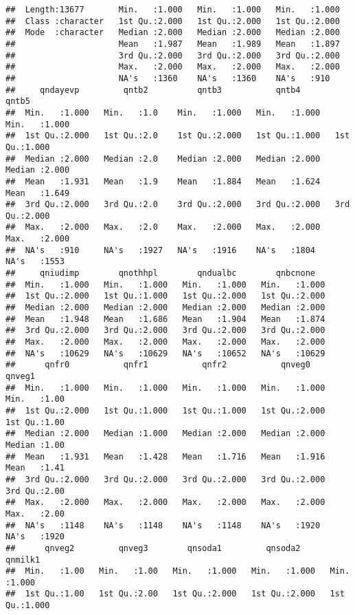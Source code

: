 \documentclass[
]{article}
\begin{document}
\begin{verbatim}
##  Length:13677       Min.   :1.000   Min.   :1.000   Min.   :1.000  
##  Class :character   1st Qu.:2.000   1st Qu.:2.000   1st Qu.:2.000  
##  Mode  :character   Median :2.000   Median :2.000   Median :2.000  
##                     Mean   :1.987   Mean   :1.989   Mean   :1.897  
##                     3rd Qu.:2.000   3rd Qu.:2.000   3rd Qu.:2.000  
##                     Max.   :2.000   Max.   :2.000   Max.   :2.000  
##                     NA's   :1360    NA's   :1360    NA's   :910    
##     qndayevp         qntb2          qntb3           qntb4           qntb5      
##  Min.   :1.000   Min.   :1.0    Min.   :1.000   Min.   :1.000   Min.   :1.000  
##  1st Qu.:2.000   1st Qu.:2.0    1st Qu.:2.000   1st Qu.:1.000   1st Qu.:1.000  
##  Median :2.000   Median :2.0    Median :2.000   Median :2.000   Median :2.000  
##  Mean   :1.931   Mean   :1.9    Mean   :1.884   Mean   :1.624   Mean   :1.649  
##  3rd Qu.:2.000   3rd Qu.:2.0    3rd Qu.:2.000   3rd Qu.:2.000   3rd Qu.:2.000  
##  Max.   :2.000   Max.   :2.0    Max.   :2.000   Max.   :2.000   Max.   :2.000  
##  NA's   :910     NA's   :1927   NA's   :1916    NA's   :1804    NA's   :1553   
##     qniudimp        qnothhpl        qndualbc        qnbcnone    
##  Min.   :1.000   Min.   :1.000   Min.   :1.000   Min.   :1.000  
##  1st Qu.:2.000   1st Qu.:1.000   1st Qu.:2.000   1st Qu.:2.000  
##  Median :2.000   Median :2.000   Median :2.000   Median :2.000  
##  Mean   :1.948   Mean   :1.686   Mean   :1.904   Mean   :1.874  
##  3rd Qu.:2.000   3rd Qu.:2.000   3rd Qu.:2.000   3rd Qu.:2.000  
##  Max.   :2.000   Max.   :2.000   Max.   :2.000   Max.   :2.000  
##  NA's   :10629   NA's   :10629   NA's   :10652   NA's   :10629  
##      qnfr0           qnfr1           qnfr2           qnveg0          qnveg1    
##  Min.   :1.000   Min.   :1.000   Min.   :1.000   Min.   :1.000   Min.   :1.00  
##  1st Qu.:2.000   1st Qu.:1.000   1st Qu.:1.000   1st Qu.:2.000   1st Qu.:1.00  
##  Median :2.000   Median :1.000   Median :2.000   Median :2.000   Median :1.00  
##  Mean   :1.931   Mean   :1.428   Mean   :1.716   Mean   :1.916   Mean   :1.41  
##  3rd Qu.:2.000   3rd Qu.:2.000   3rd Qu.:2.000   3rd Qu.:2.000   3rd Qu.:2.00  
##  Max.   :2.000   Max.   :2.000   Max.   :2.000   Max.   :2.000   Max.   :2.00  
##  NA's   :1148    NA's   :1148    NA's   :1148    NA's   :1920    NA's   :1920  
##      qnveg2         qnveg3        qnsoda1         qnsoda2         qnmilk1     
##  Min.   :1.00   Min.   :1.00   Min.   :1.000   Min.   :1.000   Min.   :1.000  
##  1st Qu.:1.00   1st Qu.:2.00   1st Qu.:2.000   1st Qu.:2.000   1st Qu.:1.000  

\end{verbatim}
\end{document}
